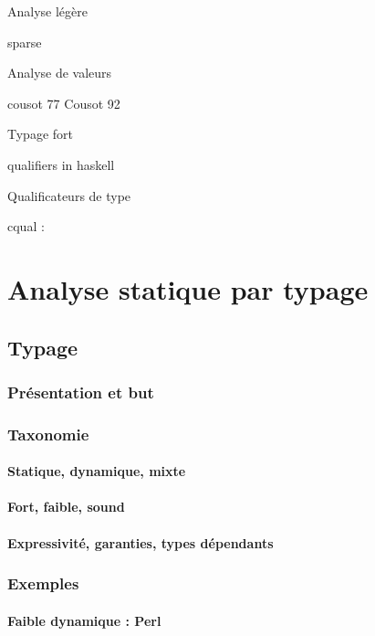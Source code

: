 \documentclass{phdthesis}
\begin{document}
Analyse légère

  sparse \cite{TorvaldsSparse}

Analyse de valeurs

cousot 77 \cite{Cousot77}
Cousot 92 \cite{Cousot92-1}

Typage fort

  \cite{TAPL}

  qualifiers in haskell
  \cite{lightweight-static-capabilities}
  \cite{LZ06a}

Qualificateurs de type

  cqual :
  \cite{pldi99,usenix01,pldi02,cquk-usenix04,toplas-quals}

\part{Analyse statique par typage}

\chapter{Typage}

\section{Présentation et but}
\section{Taxonomie}

\subsection{Statique, dynamique, mixte}
\subsection{Fort, faible, sound}
\subsection{Expressivité, garanties, types dépendants}

\section{Exemples}

\subsection{Faible dynamique : Perl}
\end{document}
